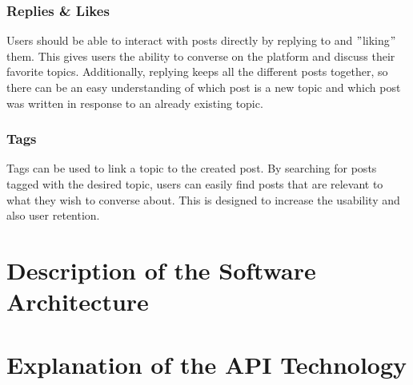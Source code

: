 \documentclass[a4paper, 11pt]{article}
\begin{document}
    \subsubsection{Replies \& Likes}
    Users should be able to interact with posts directly by replying to and \("\)liking\("\) them. This gives users the ability to converse on the platform and discuss their favorite topics. Additionally, replying keeps all the different posts together, so there can be an easy understanding of which post is a new topic and which post was written in response to an already existing topic.

    \subsubsection{Tags}
    Tags can be used to link a topic to the created post. By searching for posts tagged with the desired topic, users can easily find posts that are relevant to what they wish to converse about. This is designed to increase the usability and also user retention.




    \section{Description of the Software Architecture}\label{sec:description-of-the-software-architecture}



\section{Explanation of the API Technology}\label{sec:explanation-of-the-api-technology}
\end{document}
